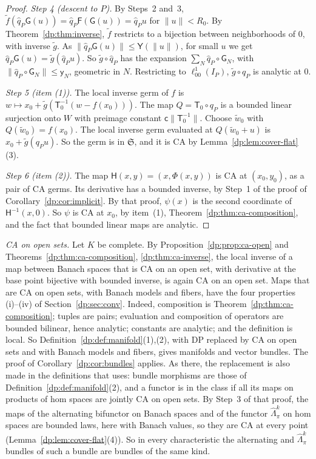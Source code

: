 \documentclass[11pt]{amsart}
\theoremstyle{definition}
\theoremstyle{remark}
\numberwithin{equation}{section}
\newcommand{\norm}[1]{\lVert #1\rVert}
\theoremstyle{plain}
\theoremstyle{definition}
\theoremstyle{plain}
\begin{document}
\begin{proof}
\emph{Step 4 (descent to $P$).} By Steps~2 and~3, $\tilde f(\hat q_P\mathsf G(u))=\hat q_P\mathsf F(\mathsf G(u))=\hat q_Pu$ for $\norm u<R_0$. By Theorem~\ref{dp:thm:inverse}, $\tilde f$ restricts to a bijection between neighborhoods of $0$, with inverse $\tilde g$. As $\norm{\hat q_P\mathsf G(u)}\le\mathsf Y(\norm u)$, for small $u$ we get $\hat q_P\mathsf G(u)=\tilde g(\hat q_Pu)$. So $\tilde g\circ\hat q_P$ has the expansion $\sum_N\hat q_P\circ\mathsf G_N$, with $\norm{\hat q_P\circ\mathsf G_N}\le\mathsf y_N$, geometric in $N$. Restricting to $\ell^1_{00}(I_P)$, $\tilde g\circ q_P$ is analytic at $0$.

\emph{Step 5 (item (1)).} The local inverse germ of $f$ is $w\mapsto x_0+\tilde g(\mathsf T_0^{-1}(w-f(x_0)))$. The map $Q=\mathsf T_0\circ q_P$ is a bounded linear surjection onto $W$ with preimage constant $\mathsf c\norm{\mathsf T_0^{-1}}$. Choose $\tilde w_0$ with $Q(\tilde w_0)=f(x_0)$. The local inverse germ evaluated at $Q(\tilde w_0+u)$ is $x_0+\tilde g(q_Pu)$. So the germ is in $\mathfrak S$, and it is CA by Lemma~\ref{dp:lem:cover-flat}(3).

\emph{Step 6 (item (2)).} The map $\mathsf H(x,y)=(x,\Phi(x,y))$ is CA at $(x_0,y_0)$, as a pair of CA germs. Its derivative has a bounded inverse, by Step~1 of the proof of Corollary~\ref{dp:cor:implicit}. By that proof, $\psi(x)$ is the second coordinate of $\mathsf H^{-1}(x,0)$. So $\psi$ is CA at $x_0$, by item~(1), Theorem~\ref{dp:thm:ca-composition}, and the fact that bounded linear maps are analytic.
\end{proof}

\emph{CA on open sets.} Let $K$ be complete. By Proposition~\ref{dp:prop:ca-open} and Theorems~\ref{dp:thm:ca-composition}, \ref{dp:thm:ca-inverse}, the local inverse of a map between Banach spaces that is CA on an open set, with derivative at the base point bijective with bounded inverse, is again CA on an open set. Maps that are CA on open sets, with Banach models and fibers, have the four properties (i)--(iv) of Section~\ref{dp:sec:conv}. Indeed, composition is Theorem~\ref{dp:thm:ca-composition}; tuples are pairs; evaluation and composition of operators are bounded bilinear, hence analytic; constants are analytic; and the definition is local. So Definition~\ref{dp:def:manifold}(1),(2), with DP replaced by CA on open sets and with Banach models and fibers, gives manifolds and vector bundles. The proof of Corollary~\ref{dp:cor:bundles} applies. As there, the replacement is also made in the definitions that \cite[Theorem~2.1]{I} uses: bundle morphisms are those of Definition~\ref{dp:def:manifold}(2), and a functor is in the class if all its maps on products of hom spaces are jointly CA on open sets. By Step~3 of that proof, the maps of the alternating bifunctor on Banach spaces and of the functor $\widehat\Lambda^k_\pi$ on hom spaces are bounded laws, here with Banach values, so they are CA at every point (Lemma~\ref{dp:lem:cover-flat}(4)). So in every characteristic the alternating and $\widehat\Lambda^k_\pi$ bundles of such a bundle are bundles of the same kind.
\end{document}
